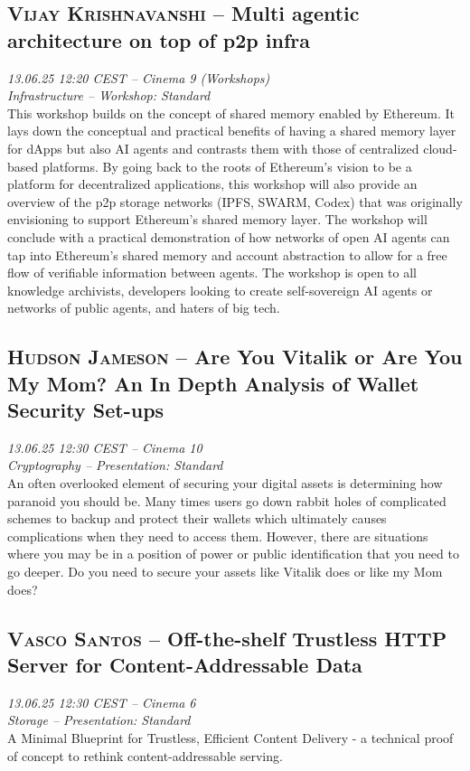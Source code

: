 \clearpage
\subsection {\textsc{Vijay Krishnavanshi}  -- Multi agentic architecture on top of p2p infra} \noindent \textit {13.06.25 12:20 CEST -- Cinema 9 (Workshops)\\ Infrastructure -- Workshop: Standard}\\[1em] This workshop builds on the concept of shared memory enabled by Ethereum. It lays down the conceptual and practical benefits of having a shared memory layer for dApps but also AI agents and contrasts them with those of centralized cloud-based platforms. By going back to the roots of Ethereum's vision to be a platform for decentralized applications, this workshop will also provide an overview of the p2p storage networks (IPFS, SWARM, Codex) that was originally envisioning to support Ethereum's shared memory layer. The workshop will conclude with a practical demonstration of how networks of open AI agents can tap into Ethereum's shared memory and account abstraction to allow for a free flow of verifiable information between agents. 
The workshop is open to all knowledge archivists, developers looking to create self-sovereign AI agents or networks of public agents, and haters of big tech.

\clearpage
\subsection {\textsc{Hudson Jameson}  -- Are You Vitalik or Are You My Mom? An In Depth Analysis of Wallet Security Set-ups} \noindent \textit {13.06.25 12:30 CEST -- Cinema 10\\ Cryptography -- Presentation: Standard}\\[1em] An often overlooked element of securing your digital assets is determining how paranoid you should be. Many times users go down rabbit holes of complicated schemes to backup and protect their wallets which ultimately causes complications when they need to access them. However, there are situations where you may be in a position of power or public identification that you need to go deeper. Do you need to secure your assets like Vitalik does or like my Mom does?

\clearpage
\subsection {\textsc{Vasco Santos}  -- Off-the-shelf Trustless HTTP Server for Content-Addressable Data} \noindent \textit {13.06.25 12:30 CEST -- Cinema 6\\ Storage -- Presentation: Standard}\\[1em] A Minimal Blueprint for Trustless, Efficient Content Delivery - a technical proof of concept to rethink content-addressable serving.

